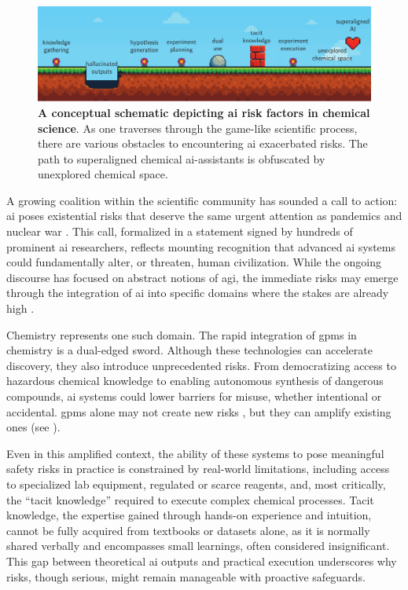 \begin{figure}[!htbp]
    \centering
    \includegraphics[width=1\linewidth]{figures/safety_chemrev_fig.pdf}
    \caption{\textbf{A conceptual schematic depicting \gls{ai} risk factors in chemical science}. As one traverses through the game-like scientific process, there are various obstacles to encountering \gls{ai} exacerbated risks. The path to superaligned chemical \gls{ai}-assistants is obfuscated by unexplored chemical space.}
    \label{fig:safety-overview}
\end{figure}

\noindent A growing coalition within the scientific community has sounded a call to action: \gls{ai} poses existential risks that deserve the same urgent attention as pandemics and nuclear war \autocite{cais2023statement}. 
This call, formalized in a statement signed by hundreds of prominent \gls{ai} researchers, reflects mounting recognition that advanced \gls{ai} systems could fundamentally alter, or threaten, human civilization. 
While the ongoing discourse has focused on abstract notions of \gls{agi}, the immediate risks may emerge through the integration of \gls{ai} into specific domains where the stakes are already high \autocite{morris2023levels}.

Chemistry represents one such domain. 
The rapid integration of \glspl{gpm} in chemistry is a dual-edged sword. 
Although these technologies can accelerate discovery, they also introduce unprecedented risks. 
From democratizing access to hazardous chemical knowledge to enabling autonomous synthesis of dangerous compounds, \gls{ai} systems could lower barriers for misuse, whether intentional or accidental. 
\glspl{gpm} alone may not create new risks \autocite{peppin2024reality}, but they can amplify existing ones (see ).

Even in this amplified context, the ability of these systems to pose meaningful safety risks in practice is constrained by real-world limitations, including access to specialized lab equipment, regulated or scarce reagents, and, most critically, the \enquote{tacit knowledge}\autocite{Polanyi_2009} required to execute complex chemical processes. 
Tacit knowledge, the expertise gained through hands-on experience and intuition, cannot be fully acquired from textbooks or datasets alone, as it is normally shared verbally and encompasses small learnings, often considered insignificant. 
This gap between theoretical \gls{ai} outputs and practical execution underscores why risks, though serious, might remain manageable with proactive safeguards.

